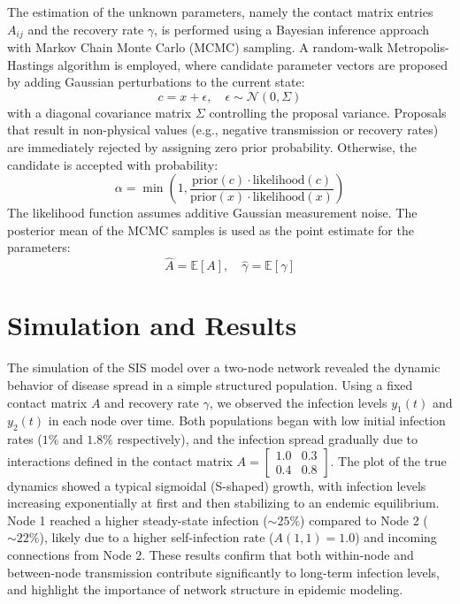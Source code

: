 \documentclass[a4paper,10pt]{report}
\begin{document}
The estimation of the unknown parameters, namely the contact matrix entries $A_{ij}$ and the recovery rate $\gamma$, is performed using a Bayesian inference approach with Markov Chain Monte Carlo (MCMC) sampling. A random-walk Metropolis-Hastings algorithm is employed, where candidate parameter vectors are proposed by adding Gaussian perturbations to the current state:
\[
c = x + \epsilon, \quad \epsilon \sim \mathcal{N}(0, \Sigma)
\]
with a diagonal covariance matrix $\Sigma$ controlling the proposal variance. Proposals that result in non-physical values (e.g., negative transmission or recovery rates) are immediately rejected by assigning zero prior probability. Otherwise, the candidate is accepted with probability:
\[
\alpha = \min \left(1, \frac{\text{prior}(c) \cdot \text{likelihood}(c)}{\text{prior}(x) \cdot \text{likelihood}(x)} \right)
\]
The likelihood function assumes additive Gaussian measurement noise. The posterior mean of the MCMC samples is used as the point estimate for the parameters:
\[
\hat{A} = \mathbb{E}[A], \quad \hat{\gamma} = \mathbb{E}[\gamma]
\]


\newpage
\section{Simulation and Results}

The simulation of the SIS model over a two-node network revealed the dynamic behavior of disease spread in a simple structured population. Using a fixed contact matrix $A$ and recovery rate $\gamma$, we observed the infection levels $y_1(t)$ and $y_2(t)$ in each node over time. Both populations began with low initial infection rates ($1\%$ and $1.8\%$ respectively), and the infection spread gradually due to interactions defined in the contact matrix $A = \begin{bmatrix} 1.0 & 0.3 \\ 0.4 & 0.8 \end{bmatrix}$. The plot of the true dynamics showed a typical sigmoidal (S-shaped) growth, with infection levels increasing exponentially at first and then stabilizing to an endemic equilibrium. Node 1 reached a higher steady-state infection ($\sim 25\%$) compared to Node 2 ($\sim 22\%$), likely due to a higher self-infection rate ($A(1,1) = 1.0$) and incoming connections from Node 2. These results confirm that both within-node and between-node transmission contribute significantly to long-term infection levels, and highlight the importance of network structure in epidemic modeling.
\end{document}
